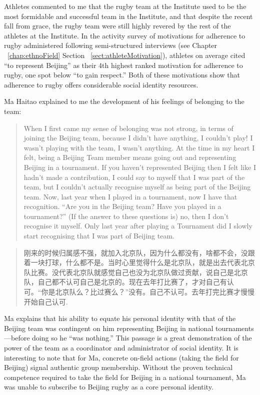 \begin{CJK}{UTF8}{gbsn}
Athletes commented to me that the rugby team at the Institute used to be the most formidable and successful team in the Institute, and that despite the recent fall from grace, the rugby team were still highly revered by the rest of the athletes at the Institute.  In the activity survey of motivations for adherence to rugby administered following semi-structured interviews (see Chapter ~\ref{chap:ethnoField} Section ~\ref{sect:athleteMotivation}), athletes on average cited ``to represent Beijing'' as their 4th highest ranked motivation for adherence to rugby, one spot below ``to gain respect.''  Both of these motivations show that adherence to rugby offers considerable social identity resources.

Ma Haitao explained to me the development of his feelings of belonging to the team:

  \begin{quote}
    When I first came my sense of belonging was not strong, in terms of joining the Beijing team, because I didn’t have anything, I couldn’t play! I wasn’t playing with the team, I wasn’t anything.  At the time in my heart I felt, being a Beijing Team member means going out and representing Beijing in a tournament.  If you haven’t represented Beijing then I felt like I hadn’t made a contribution, I could say to myself that I was part of the team, but I couldn’t actually recognise myself as being part of the Beijing team.  Now, last year when I played in a tournament, now I have that recognition. ``Are you in the Beijing team? Have you played in a tournament?'' (If the answer to these questions is) no, then I don’t recognise it myself.  Only last year after playing a Tournament did I slowly start recognising that I was part of Beijing team.
  \end{quote}

  \begin{quote}
    刚来的时候归属感不强，就加入北京队，因为什么都没有，啥都不会，没跟着一块打球，什么都不是。当时心里觉得什么是北京队，就是出去代表北京队比赛。没代表北京队就感觉自己也没为北京队做过贡献，说自己是北京队，自己都不认可自己是北京的。现在去年打比赛了，才对自己有认可。“你是北京队么？比过赛么？”没有。自己不认可。去年打完比赛才慢慢开始自己认可.
  \end{quote}

Ma explains that his ability to equate his personal identity with that of the Beijing team was contingent on him representing Beijing in national tournaments---before doing so he ``was nothing.''  This passage is a great demonstration of the power of the team as a coordinator and administrator of social identity.  It is interesting to note that for Ma, concrete on-field actions (taking the field for Beijing) signal authentic group membership.  Without the proven technical competence required to take the field for Beijing in a national tournament, Ma was unable to subscribe to Beijing rugby as a core personal identity.


\end{CJK}
